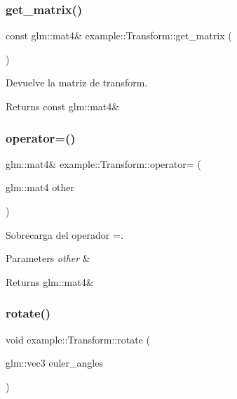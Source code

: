 \subsubsection{\texorpdfstring{get\_matrix()}{get\_matrix()}}
{\footnotesize\ttfamily const glm\+::mat4\& example\+::\+Transform\+::get\+\_\+matrix (\begin{DoxyParamCaption}{ }\end{DoxyParamCaption})}



Devuelve la matriz de transform. 

\begin{DoxyReturn}{Returns}
const glm\+::mat4\& 
\end{DoxyReturn}
\mbox{\label{classexample_1_1_transform_aecbcb584dbcd3b76bdffd3b2a70c9a5f}} 
\subsubsection{\texorpdfstring{operator=()}{operator=()}}
{\footnotesize\ttfamily glm\+::mat4\& example\+::\+Transform\+::operator= (\begin{DoxyParamCaption}\item[{glm\+::mat4}]{other }\end{DoxyParamCaption})\hspace{0.3cm}{\ttfamily [inline]}}



Sobrecarga del operador =. 


\begin{DoxyParams}{Parameters}
{\em other} & \\
\hline
\end{DoxyParams}
\begin{DoxyReturn}{Returns}
glm\+::mat4\& 
\end{DoxyReturn}
\mbox{\label{classexample_1_1_transform_a0336a174c3ddaa8f670345cb0c6202a8}} 
\subsubsection{\texorpdfstring{rotate()}{rotate()}}
{\footnotesize\ttfamily void example\+::\+Transform\+::rotate (\begin{DoxyParamCaption}\item[{glm\+::vec3}]{euler\+\_\+angles }\end{DoxyParamCaption})}



